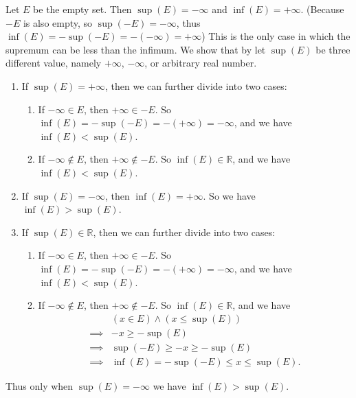 \setcounter{theorem}{9}
\begin{example}\label{6.2.10}
Let \(E\) be the empty set.
Then \(\sup(E) = -\infty\) and \(\inf(E) = +\infty\).
(Because \(-E\) is also empty, so \(\sup(-E) = -\infty\), thus \(\inf(E) = -\sup(-E) = -(-\infty) = +\infty\))
This is the only case in which the supremum can be less than the infimum.
We show that by let \(\sup(E)\) be three different value, namely \(+\infty\), \(-\infty\), or arbitrary real number.
\begin{enumerate}[label=(\Roman*)]
    \item If \(\sup(E) = +\infty\), then we can further divide into two cases:
    \begin{enumerate}[label=(\roman*)]
        \item If \(-\infty \in E\), then \(+\infty \in -E\).
        So \(\inf(E) = -\sup(-E) = -(+\infty) = -\infty\), and we have \(\inf(E) < \sup(E)\).
        \item If \(-\infty \not\in E\), then \(+\infty \not\in -E\).
        So \(\inf(E) \in \mathds{R}\), and we have \(\inf(E) < \sup(E)\).
    \end{enumerate}
    \item If \(\sup(E) = -\infty\), then \(\inf(E) = +\infty\).
    So we have \(\inf(E) > \sup(E)\).
    \item If \(\sup(E) \in \mathds{R}\), then we can further divide into two cases:
    \begin{enumerate}[label=(\roman*)]
        \item If \(-\infty \in E\), then \(+\infty \in -E\).
        So \(\inf(E) = -\sup(-E) = -(+\infty) = -\infty\), and we have \(\inf(E) < \sup(E)\).
        \item If \(-\infty \not\in E\), then \(+\infty \not\in -E\).
        So \(\inf(E) \in \mathds{R}\), and we have
        \begin{align*}
            & (x \in E) \land (x \leq \sup(E)) \\
            \implies & -x \geq -\sup(E) \\
            \implies & \sup(-E) \geq -x \geq -\sup(E) \\
            \implies & \inf(E) = -\sup(-E) \leq x \leq \sup(E).
        \end{align*}
    \end{enumerate}
\end{enumerate}
Thus only when \(\sup(E) = -\infty\) we have \(\inf(E) > \sup(E)\).
\end{example}

